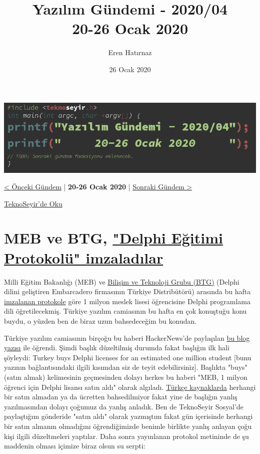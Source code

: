 \documentclass[11pt]{article}
\author{Eren Hatırnaz}
\date{26 Ocak 2020}
\title{Yazılım Gündemi - 2020/04\\\medskip
\large 20-26 Ocak 2020}
\begin{document}
\maketitle
\tableofcontents \clearpage\shorthandoff{=}

\begin{center}
\includegraphics[width=.9\linewidth]{gorseller/yazilim-gundemi-banner.png}
\end{center}

\begin{center}
\href{../03/yazilim-gundemi-2020-03.pdf}{< Önceki Gündem} | \textbf{20-26 Ocak 2020} | \href{../05/yazilim-gundemi-2020-05.pdf}{Sonraki Gündem >}

\href{https://teknoseyir.com/blog/yazilim-gundemi-2020-04}{TeknoSeyir'de Oku}
\end{center}

\section{MEB ve BTG, \href{https://www.meb.gov.tr/1-milyon-meslek-lisesi-ogrencisine-yazilim-egitimi/haber/20138/tr}{"Delphi Eğitimi Protokolü" imzaladılar}}
\label{sec:org464c067}
Milli Eğitim Bakanlığı (MEB) ve \href{https://www.btgrubu.com/}{Bilişim ve Teknoloji Grubu (BTG)} (Delphi dilini
geliştiren Embarcadero firmasının Türkiye Distribütörü) arasında bu hafta
\href{https://www.btgrubu.com/wp-content/uploads/2020/01/MEB-BTG-Protokol-1.pdf}{imzalanan protokole} göre 1 milyon meslek lisesi öğrencisine Delphi programlama
dili öğretilecekmiş. Türkiye yazılım camiasının bu hafta en çok konuştuğu konu
buydu, o yüzden ben de biraz uzun bahsedeceğim bu konudan.

Türkiye yazılım camiasının birçoğu bu haberi HackerNews'de paylaşılan \href{https://jonlennartaasenden.wordpress.com/2020/01/20/turkey-buys-delphi-licenses-for-an-estimated-one-million-students/}{bu blog
yazısı} ile öğrendi. Şimdi başlık düzeltilmiş durumda fakat başlığın ilk hali
şöyleydi: Turkey buys Delphi licenses for an estimated one million student
[bunu yazının bağlantısındaki ilgili kısımdan siz de teyit edebilirsiniz].
Başlıkta "buys" (satın almak) kelimesinin geçmesinden dolayı herkes bu haberi
"MEB, 1 milyon öğrenci için Delphi lisansı satın aldı" olarak algıladı. \href{https://www.timeturk.com/meb-den-1-milyon-meslek-lisesi-ogrencisine-yazilim-egitimi/haber-1337091}{Türkçe
kaynaklarda} herhangi bir satın almadan ya da ücretten bahsedilmiyor fakat yine
de başlığın yanlış yazılmasından dolayı çoğumuz da yanlış anladık. Ben de
TeknoSeyir Sosyal'de paylaştığım gönderide "satın aldı" olarak yazmıştım fakat
gün içerisinde herhangi bir satın almanın olmadığını öğrendiğimizde benimle
birlikte yanlış anlayan çoğu kişi ilgili düzeltmeleri yaptılar. Daha sonra
yayınlanan protokol metininde de şu maddenin olması içimize biraz olsun su
serpti:
\end{document}
